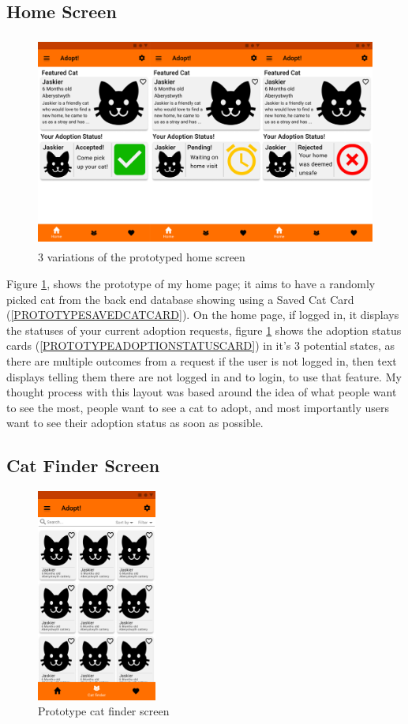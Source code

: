 \subsection{Home Screen}

\begin{figure} [htbp!]
    \centering
    \includegraphics[height=7cm]{Images/PrototypeHomeScreen.png}
    \caption{3 variations of the prototyped home screen}
    \label{fig:prototype_home}
\end{figure}

Figure \ref{fig:prototype_home}, shows the prototype of my home page; it aims to have a randomly picked cat from the back end database showing using a Saved Cat Card (\ref{PROTOTYPESAVEDCATCARD}). On the home page, if logged in, it displays the statuses of your current adoption requests, figure \ref{fig:prototype_home} shows the adoption status cards (\ref{PROTOTYPEADOPTIONSTATUSCARD}) in it's 3 potential states, as there are multiple outcomes from a request if the user is not logged in, then text displays telling them there are not logged in and to login, to use that feature. My thought process with this layout was based around the idea of what people want to see the most, people want to see a cat to adopt, and most importantly users want to see their adoption status as soon as possible.

\subsection{Cat Finder Screen}

\begin{figure} [htbp!]
    \centering
    \includegraphics[height=7cm]{Images/PrototypeCatFinder.png}
    \caption{Prototype cat finder screen}
    \label{fig:prototype_cat_finder}
\end{figure}

